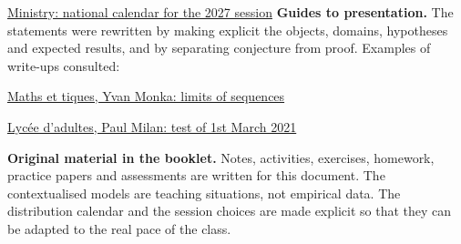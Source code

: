 \href{https://www.education.gouv.fr/reussir-au-lycee/baccalaureat-brevet-cap-le-calendrier-2027-341384}{Ministry: national calendar for the 2027 session}
\textbf{Guides to presentation.} The statements were rewritten by making explicit the objects, domains, hypotheses and expected results, and by separating conjecture from proof. Examples of write-ups consulted:\par
\href{https://www.maths-et-tiques.fr/telech/20SuitesTS2.pdf}{Maths et tiques, Yvan Monka: limits of sequences}\par
\href{https://www.lyceedadultes.fr/sitepedagogique/documents/math/mathTermSpe/ctrle_2020_2021/13_devoir_01_03_2021.pdf}{Lycée d'adultes, Paul Milan: test of 1st March 2021}\par
\textbf{Original material in the booklet.} Notes, activities, exercises, homework, practice papers and assessments are written for this document. The contextualised models are teaching situations, not empirical data. The distribution calendar and the session choices are made explicit so that they can be adapted to the real pace of the class.




